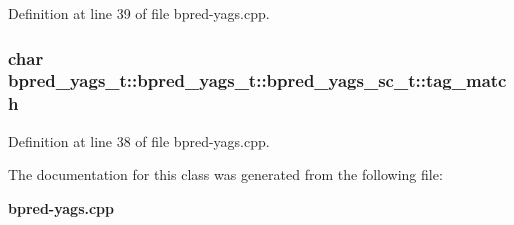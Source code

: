 Definition at line 39 of file bpred-yags.cpp.
\subsubsection[{tag\_\-match}]{\setlength{\rightskip}{0pt plus 5cm}char bpred\_\-yags\_\-t::bpred\_\-yags\_\-t::bpred\_\-yags\_\-sc\_\-t::tag\_\-match}\label{classbpred__yags__t_1_1bpred__yags__sc__t_48b3e0cde83d016727de4952942a95b8}




Definition at line 38 of file bpred-yags.cpp.

The documentation for this class was generated from the following file:\begin{CompactItemize}
\item 
{\bf bpred-yags.cpp}\end{CompactItemize}
